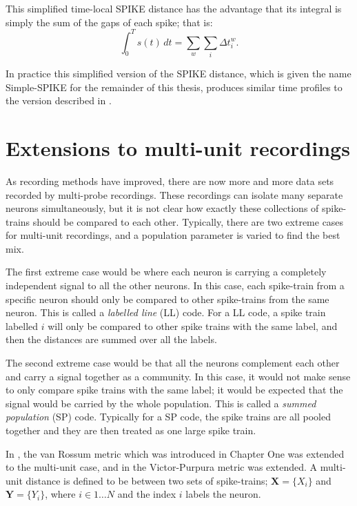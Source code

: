 This simplified time-local SPIKE distance has the advantage that its integral is simply the sum of the gaps of each spike; that is:
\begin{equation}
\int_0^T s(t)\, dt = \sum_w \sum_i \Delta t_i^w.
\end{equation}

In practice this simplified version of the SPIKE distance, which is given the name Simple-SPIKE for the remainder of this thesis, produces similar time profiles to the version described in \citep{KreuzEtAl2011a}.


\section{Extensions to multi-unit recordings}
As recording methods have improved, there are now more and more data sets recorded by multi-probe recordings.  These recordings can isolate many separate neurons simultaneously, but it is not clear how exactly these collections of spike-trains should be compared to each other.  Typically, there are two extreme cases for multi-unit recordings, and a population parameter is varied to find the best mix.  

The first extreme case would be where each neuron is carrying a completely independent signal to all the other neurons.  In this case, each spike-train from a specific neuron should only be compared to other spike-trains from the same neuron.  This is called a \emph{labelled line} (LL) code.  For a LL code, a spike train labelled $i$ will only be compared to other spike trains with the same label, and then the distances are summed over all the labels.

The second extreme case would be that all the neurons complement each other and carry a signal together as a community.  In this case, it would not make sense to only compare spike trains with the same label; it would be expected that the signal would be carried by the whole population.  This is called a \emph{summed population} (SP) code.  Typically for a SP code, the spike trains are all pooled together and they are then treated as one large spike train.

In \citep{HoughtonSen2008a}, the van Rossum metric which was introduced in Chapter One was extended to the multi-unit case, and in \citep{AronovEtAl2003a} the Victor-Purpura metric was extended.  A multi-unit distance is defined to be between two sets of spike-trains; $\mathbf{X}=\{ X_i \}$ and $ \mathbf{Y}=\{ Y_i \}$, where $i \in 1\ldots N$ and the index $i$ labels the neuron.

